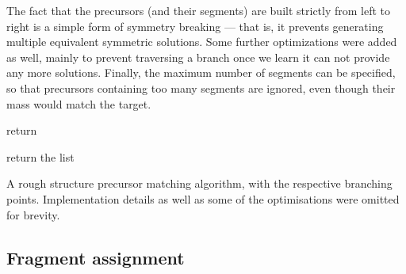 The fact that the precursors (and their segments) are built strictly from left to right is a simple form of symmetry breaking --- that is, it prevents generating multiple equivalent symmetric solutions. Some further optimizations were added as well, mainly to prevent traversing a branch once we learn it can not provide any more solutions. Finally, the maximum number of segments can be specified, so that precursors containing too many segments are ignored, even though their mass would match the target.


\begin{algorithm}
  \begin{algorithmic}

    \label{alg:findprec:combinations} 
    \EndIf

    \State return  
    \EndIf

    \label{alg:findprec:end}
    \EndFor
    \EndIf


    \label{alg:findprec:elongate}

    \State return the list 
    \EndFunction
  \end{algorithmic}
  \caption{A rough structure precursor matching algorithm, with the respective branching points. Implementation details as well as some of the optimisations were omitted for brevity.}\label{alg:findprec}
\end{algorithm}

\subsection{Fragment assignment}

